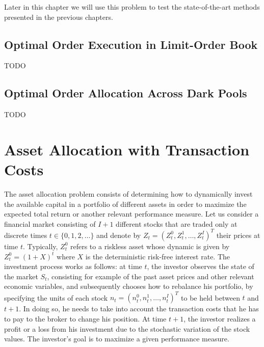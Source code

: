 Later in this chapter we will use this problem to test the state-of-the-art methods presented in the previous chapters. 

\subsection{Optimal Order Execution in Limit-Order Book}
TODO 

\subsection{Optimal Order Allocation Across Dark Pools}
TODO


\section{Asset Allocation with Transaction Costs}
\label{sec:asset_allocation_with_transaction_costs}

The asset allocation problem consists of determining how to dynamically invest
the available capital in a portfolio of different assets in order to maximize
the expected total return or another relevant performance measure. Let us
consider a financial market consisting of $I+1$ different stocks that are
traded only at discrete times $t \in \{0, 1, 2, \ldots\}$ and denote by
${Z}_t = {(Z_t^0, Z_t^1, \ldots, Z_t^I)}^T$ their prices at time $t$.
Typically, $Z_t^0$ refers to a riskless asset whose dynamic is given by $Z_t^0
= {(1 + X)}^t$ where $X$ is the deterministic risk-free interest rate. The
investment process works as follows: at time $t$, the investor observes the
state of the market $S_t$, consisting for example of the past asset prices and
other relevant economic variables, and subsequently chooses how to rebalance
his portfolio, by specifying the units of each stock ${n}_t = {(n_t^0 ,
n_t^1 , \ldots , n_t^I)}^T$ to be held between $t$ and $t+1$. In doing so, he
needs to take into account the transaction costs that he has to pay to the
broker to change his position.  At time $t+1$, the investor realizes a profit
or a loss from his investment due to the stochastic variation of the stock
values. The investor’s goal is to maximize a given performance measure.

